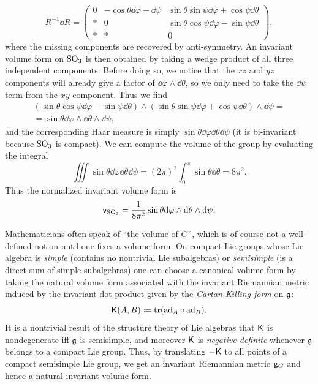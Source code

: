\begin{example}
    \[R^{-1}\dd R=\begin{pmatrix}
        0& -\cos\theta\dd\varphi-\dd\psi& \sin\theta\sin\psi\dd\varphi+\cos\psi\dd\theta\\
        \ast & 0 & \sin\theta\cos\psi\dd\varphi-\sin\psi\dd\theta\\
        \ast & \ast & 0
    \end{pmatrix},\]
    where the missing components are recovered by anti-symmetry. An invariant volume form on $\operatorname{SO}_3$ is then obtained by taking a wedge product of all three independent components. Before doing so, we notice that the $xz$ and $yz$ components will already give a factor of $\dd\varphi\wedge\dd\theta$, so we only need to take the $\dd\psi$ term from the $xy$ component. Thus we find
    \begin{multline}
        (\sin\theta\cos\psi\dd\varphi-\sin\psi\dd\theta)\wedge (\sin\theta\sin\psi\dd\varphi+\cos\psi\dd\theta)\wedge\dd\psi=\\
        =\sin\theta\dd\varphi\wedge \dd\theta\wedge \dd\psi,
    \end{multline}
    and the corresponding Haar measure is simply $\sin\theta\dd\varphi\dd\theta\dd\psi$ (it is bi-invariant because $\operatorname{SO}_3$ is compact). We can compute the volume of the group by evaluating the integral
    \[\iiint \sin\theta\dd\varphi\dd\theta\dd\psi=(2\pi)^2\int_0^\pi\sin\theta\dd\theta=8\pi^2.\]
    Thus the normalized invariant volume form is
    \[\mathsf{v}_{\operatorname{SO}_3}=\frac{1}{8\pi^2}\sin\theta{\mathrm{d}}\varphi\wedge {\mathrm{d}}\theta\wedge {\mathrm{d}}\psi.\]
\end{example}

\begin{rem}
    Mathematicians often speak of ``the volume of $G$'', which is of course not a well-defined notion until one fixes a volume form. On compact Lie groups whose Lie algebra is \emph{simple} (contains no nontrivial Lie subalgebras) or \emph{semisimple} (is a direct sum of simple subalgebras) one can choose a canonical volume form by taking the natural volume form associated with the invariant Riemannian metric induced by the invariant dot product given by the \emph{Cartan-Killing form} on $\mathfrak{g}$: \[\mathsf{K}(A,B)\coloneqq \operatorname{tr}(\mathrm{ad}_A\circ \mathrm{ad}_B).\] 
    It is a nontrivial result of the structure theory of Lie algebras that $\mathsf{K}$ is nondegenerate iff $\mathfrak{g}$ is semisimple, and moreover $\mathsf{K}$ is \emph{negative definite} whenever $\mathfrak{g}$ belongs to a compact Lie group. Thus, by translating $-\mathsf{K}$ to all points of a compact semisimple Lie group, we get an invariant Riemannian metric $\mathsf{g}_G$ and hence a natural invariant volume form.
\end{rem}


